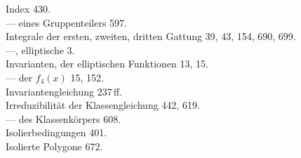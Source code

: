 \begin{minipage}[t]{0.48\textwidth}
Index 430. \\
--- eines Gruppenteilers 597. \\
Integrale der ersten, zweiten, dritten Gattung 39, 43, 154, 690, 699. \\
---, elliptische 3. \\
Invarianten, der elliptischen Funktionen 13, 15. \\
--- der $f_4(x)$ 15, 152. \\
Invariantengleichung 237\,ff. \\
Irreduzibilität der Klassengleichung 442, 619. \\
--- des Klassenkörpers 608. \\
Isolierbedingungen 401. \\
Isolierte Polygone 672.
\end{minipage}
